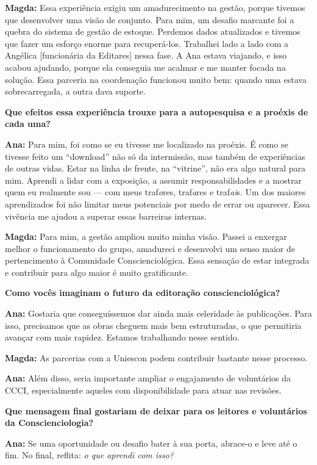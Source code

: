\documentclass[
]{article}
\begin{document}
\textbf{Magda:} Essa experiência exigiu um amadurecimento na gestão, porque tivemos que desenvolver uma visão de conjunto. Para mim, um desafio marcante foi a quebra do sistema de gestão de estoque. Perdemos dados atualizados e tivemos que fazer um esforço enorme para recuperá-los. Trabalhei lado a lado com a Angélica {[}funcionária da Editares{]} nessa fase. A Ana estava viajando, e isso acabou ajudando, porque ela conseguia me acalmar e me manter focada na solução. Essa parceria na coordenação funcionou muito bem: quando uma estava sobrecarregada, a outra dava suporte.

\textbf{Que efeitos essa experiência trouxe para a autopesquisa e a proéxis de cada uma?}

\textbf{Ana:} Para mim, foi como se eu tivesse me localizado na proéxis. É como se tivesse feito um ``download'' não só da intermissão, mas também de experiências de outras vidas. Estar na linha de frente, na ``vitrine'', não era algo natural para mim. Aprendi a lidar com a exposição, a assumir responsabilidades e a mostrar quem eu realmente sou --- com meus traf\emph{o}res, traf\emph{a}res e traf\emph{ai}s. Um dos maiores aprendizados foi não limitar meus potenciais por medo de errar ou aparecer. Essa vivência me ajudou a superar essas barreiras internas.

\textbf{Magda:} Para mim, a gestão ampliou muito minha visão. Passei a enxergar melhor o funcionamento do grupo, amadureci e desenvolvi um senso maior de pertencimento à Comunidade Conscienciológica. Essa sensação de estar integrada e contribuir para algo maior é muito gratificante.

\textbf{Como vocês imaginam o futuro da editoração conscienciológica?}

\textbf{Ana:} Gostaria que conseguíssemos dar ainda mais celeridade às publicações. Para isso, precisamos que as obras cheguem mais bem estruturadas, o que permitiria avançar com mais rapidez. Estamos trabalhando nesse sentido.

\textbf{Magda:} As parcerias com a Uniescon podem contribuir bastante nesse processo.

\textbf{Ana:} Além disso, seria importante ampliar o engajamento de voluntários da CCCI, especialmente aqueles com disponibilidade para atuar nas revisões.

\textbf{Que mensagem final gostariam de deixar para os leitores e voluntários da Conscienciologia?}

\textbf{Ana:} Se uma oportunidade ou desafio bater à sua porta, abrace-o e leve até o fim. No final, reflita: \emph{o que aprendi com isso?}
\end{document}
